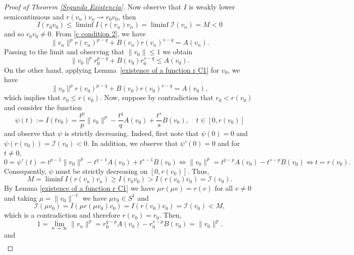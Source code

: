 \documentclass[12pt,reqno]{amsart}
\begin{document}
\begin{proof}[Proof of Theorem \ref{Segundo Existencia}]
 Now observe that $I$ is weakly lower semicontinuous and $r(v_n)v_n \rightharpoonup r_0v_0$, then
  \[
  I(r_0v_0)\leq \liminf I(r(v_n)v_n)=\liminf \mathcal{I}(v_n)=M<0
  \]
and so $r_0v_0\neq 0$. From \eqref{c condition 2}, we have 	
\begin{equation*}\label{r0 equation}
		\|v_n\|^pr(v_n)^{p-q}+B(v_n)r(v_n)^{s-q}= A(v_n).
	\end{equation*}
Passing to the limit and observing that $\|v_0\|\leq 1$ we obtain
\begin{equation*}
    \|v_0\|^p r_0^{p-q}+B(v_0)r_0^{s-q}\leq A(v_0).
\end{equation*}
On the other hand, applying Lemma~\ref{existence of a function r C1} for $v_0$, we have
\begin{equation*}\label{key equation}
    \|v_0\|^pr(v_0)^{p-q}+B(v_0)r(v_0)^{s-q}=A(v_0),
\end{equation*}
which implies that $r_0\leq r(v_0)$. Now, suppose by contradiction that $r_0<r(v_0)$ and consider the function 
	\begin{equation*}
		\psi(t):=I(tv_0)=\frac{t^p}{p}\|v_0\|^p-\frac{t^q}{q}A(v_0)+\frac{t^s}{s}B(v_0),\quad t\in [0,r(v_0)]
	\end{equation*}
	and observe that $\psi$ is strictly decreasing. Indeed, first note that $\psi(0)=0$ and $\psi(r(v_0))=\mathcal{I}(v_0)<0$. In addition, we observe that $\psi'(0)=0$ and for $t\neq 0$,
 \begin{equation*}
     0=\psi'(t)=t^{p-1}\|v_0\|^p-t^{q-1}A(v_0)+t^{s-1}B(v_0)\Leftrightarrow \|v_0\|^p=t^{q-p}A(v_0)-t^{s-p}B(v_0)\Leftrightarrow t=r(v_0).
 \end{equation*}
Consequently, $\psi$ must be strictly decreasing on $[0,r(v_0)]$. Thus,
 \begin{equation*}
M=\liminf I(r(v_n)v_n)\geq I(r_0v_0)>I(r(v_0)v_0)=\mathcal{I}(v_0).    
 \end{equation*}
By Lemma \ref{existence of a function r C1} we have $\mu r(\mu v )=r(v)$ for all $v\neq 0$ and taking $\mu =\|v_0\|^{-1}$ we have $\mu v_0 \in S^1$ and
\begin{equation*}
    \mathcal{I}(\mu v_0)=I(\mu r(\mu v_0)v_0)=I(r(v_0)v_0)=\mathcal{I}(v_0)< M,
\end{equation*}
which is a contradiction and therefore $r(v_0)=r_0$. Then,
\begin{equation*}
    1=\lim_{n\rightarrow \infty} \|v_n\|^p=r_0^{q-p}A(v_0)-r_0^{s-p}B(v_0)=\|v_0\|^p.
\end{equation*}
and
\begin{align*}

\end{align*}
\end{proof}
\end{document}
